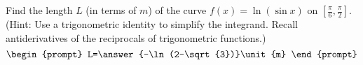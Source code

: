 \documentclass{ximera}
\author{Gregory Hartman \and Matthew Carr}
\begin{document}
\begin{exercise}





Find the length $L$ (in terms of $\unit{m}$) of the curve $f(x)=\ln(\sin x)$ on $[\frac{\pi}{6},\frac{\pi}{2}]$. (Hint: Use a trigonometric identity to simplify the integrand. Recall antiderivatives of the reciprocals of trigonometric functions.)
\[
\begin{prompt}
L=\answer{-\ln(2-\sqrt{3})}\unit{m}
\end{prompt}
\]




\end{exercise}
\end{document}
